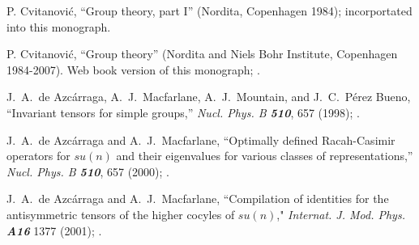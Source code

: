   P. Cvitanovi\'c,
    ``Group theory, part I''
    (Nordita, Copenhagen 1984); incorportated into this monograph.

 P. Cvitanovi\'c,
    ``Group theory''
    (Nordita and Niels Bohr Institute,
    Copenhagen 1984-2007). Web book version of this monograph;
    {\wwwcb{}}.






J.~A.~de Azc{\'a}rraga, A.~J.~Macfarlane, A.~J.~Mountain, and J.~C.~P\'erez Bueno,
    ``Invariant tensors for simple groups,''
    {\em Nucl.  Phys.  B \bf 510}, 657 (1998);
    .

 J.~A.~de Azc{\'a}rraga and A.~J.~Macfarlane,
    ``Optimally defined Racah-Casimir operators for $su(n)$ and their
      eigenvalues for various classes of representations,''
    {\em Nucl.  Phys.  B \bf 510}, 657 (2000);
    .

 J.~A.~de Azc{\'a}rraga and A.~J.~Macfarlane,
    ``Compilation of identities for the antisymmetric tensors of
      the higher cocyles of $su(n)$,"
    {\em Internat. J. Mod. Phys. \bf A16} 1377 (2001); %
    .





